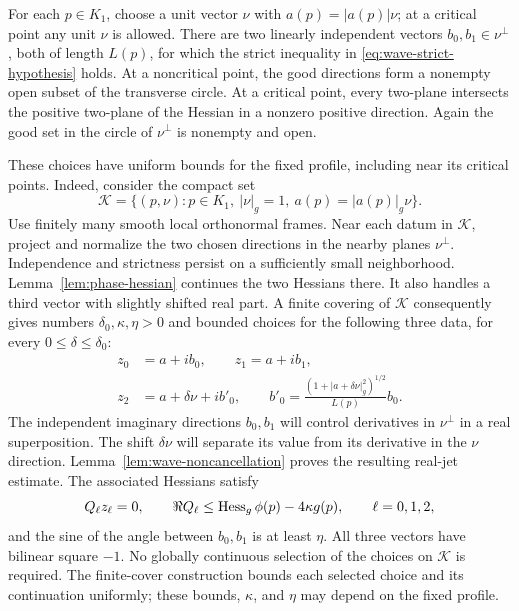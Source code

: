 For each $p\in K_1$, choose a unit vector $\nu$ with
$a(p)=|a(p)|\nu$; at a critical point any unit $\nu$ is allowed.
There are two linearly independent vectors $b_0,b_1\in\nu^\perp$,
both of length $L(p)$, for which the strict inequality in
\eqref{eq:wave-strict-hypothesis} holds.  At a noncritical point,
the good directions form a nonempty open subset of the transverse
circle.  At a critical point, every two-plane intersects the positive
two-plane of the Hessian in a nonzero positive direction.  Again the
good set in the circle of $\nu^\perp$ is nonempty and open.

These choices have uniform bounds for the fixed profile, including near
its critical points.  Indeed, consider the compact set
\[
 \mathcal K=\{(p,\nu):p\in K_1,\ |\nu|_g=1,
                         \ a(p)=|a(p)|_g\nu\}.
\]
Use finitely many smooth local orthonormal frames.  Near each datum in
$\mathcal K$, project and normalize the two chosen directions in the
nearby planes $\nu^\perp$.  Independence and strictness persist on a
sufficiently small neighborhood.  Lemma~\ref{lem:phase-hessian} continues
the two Hessians there.  It also handles a third vector with slightly
shifted real part.  A finite covering of $\mathcal K$ consequently gives
numbers $\delta_0,\kappa,\eta>0$ and bounded choices for the following
three data, for every $0\le\delta\le\delta_0$:
\begin{equation}
 \begin{split}
 z_0&=a+ib_0,\qquad z_1=a+ib_1,\\
 z_2&=a+\delta\nu+ib'_0,
 \qquad
 b'_0=\frac{(1+|a+\delta\nu|_g^2)^{1/2}}{L(p)}b_0.
 \end{split}
 \label{eq:three-phase-data}
\end{equation}
The independent imaginary directions $b_0,b_1$ will control derivatives
in $\nu^\perp$ in a real superposition.  The shift $\delta\nu$ will
separate its value from its derivative in the $\nu$ direction.
Lemma~\ref{lem:wave-noncancellation} proves the resulting real-jet estimate.
The associated Hessians satisfy
\begin{equation}
 Q_\ell z_\ell=0,\qquad
 \Re Q_\ell\le\operatorname{Hess}_g\phi(p)-4\kappa g(p),
 \qquad \ell=0,1,2,
 \label{eq:uniform-phase-gap}
\end{equation}
and the sine of the angle between $b_0,b_1$ is at least $\eta$.
All three vectors have bilinear square $-1$.  No globally continuous
selection of the choices on $\mathcal K$ is required.  The finite-cover
construction bounds each selected choice and its continuation uniformly;
these bounds, $\kappa$, and $\eta$ may depend on the fixed profile.

